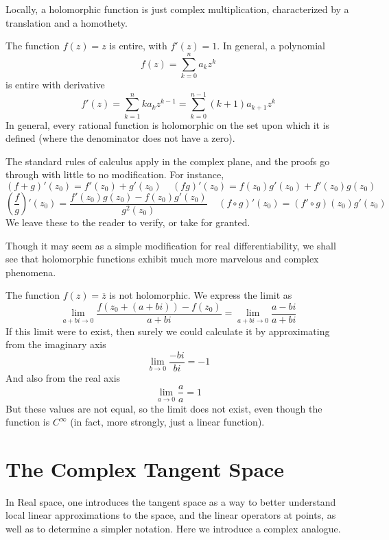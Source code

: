 Locally, a holomorphic function is just complex multiplication, characterized by a translation and a homothety.

\begin{example}
    The function $f(z) = z$ is entire, with $f'(z) = 1$. In general, a polynomial
    \[ f(z) = \sum_{k = 0}^n a_k z^k \]
    is entire with derivative
    \[ f'(z) = \sum_{k = 1}^n k a_k z^{k-1} = \sum_{k = 0}^{n-1} (k + 1) a_{k+1} z^k \]
    In general, every rational function is holomorphic on the set upon which it is defined (where the denominator does not have a zero).
\end{example}

The standard rules of calculus apply in the complex plane, and the proofs go through with little to no modification. For instance,
%
\[ (f + g)'(z_0) = f'(z_0) + g'(z_0)\ \ \ \ \ (fg)'(z_0) = f(z_0)g'(z_0) + f'(z_0)g(z_0) \]
%
\[ \left(\frac{f}{g}\right)'(z_0) = \frac{f'(z_0)g(z_0) - f(z_0)g'(z_0)}{g^2(z_0)}\ \ \ \ \ (f \circ g)'(z_0) = (f' \circ g)(z_0) g'(z_0) \]
%
We leave these to the reader to verify, or take for granted.

Though it may seem as a simple modification for real differentiability, we shall see that holomorphic functions exhibit much more marvelous and complex phenomena.

\begin{example}
    The function $f(z) = \overline{z}$ is not holomorphic. We express the limit as
    \[ \lim_{a + bi \to 0} \frac{f(z_0 + (a + bi)) - f(z_0)}{a + bi} = \lim_{a + bi \to 0} \frac{a - bi}{a + bi} \]
    If this limit were to exist, then surely we could calculate it by approximating from the imaginary axis
    \[ \lim_{b \to 0} \frac{-bi}{bi} = -1 \]
    And also from the real axis
    \[ \lim_{a \to 0} \frac{a}{a} = 1 \]
    But these values are not equal, so the limit does not exist, even though the function is $C^\infty$ (in fact, more strongly, just a linear function).
\end{example}



\section{The Complex Tangent Space}

In Real space, one introduces the tangent space as a way to better understand local linear approximations to the space, and the linear operators at points, as well as to determine a simpler notation. Here we introduce a complex analogue.

